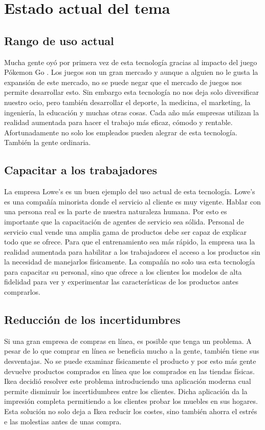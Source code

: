 \documentclass[a4paper,11pt]{scrartcl}
\begin{document}
\section{Estado actual del tema}
\subsection{Rango de uso actual}
Mucha gente oyó por primera vez de esta tecnología gracias al impacto del juego Pókemon Go \cite{pokemongo}. Los juegos son un gran mercado y aunque a alguien no le gusta la expansión de este mercado, no se puede negar que el mercado de juegos nos permite desarrollar esto. Sin embargo esta tecnología no nos deja solo diversificar nuestro ocio, pero también desarrollar el deporte, la medicina, el marketing, la ingeniería, la educación y muchas otras cosas. Cada año más empresas utilizan la realidad aumentada para hacer el trabajo más eficaz, cómodo y rentable. Afortunadamente no solo los empleados pueden alegrar de esta tecnología. También la gente ordinaria.

\subsection{Capacitar a los trabajadores}
La empresa Lowe's es un buen ejemplo del uso actual de esta tecnología. Lowe's es una compañía minorista donde el servicio al cliente es muy vigente. Hablar con una persona real es la parte de nuestra naturaleza humana. Por esto es importante que la capacitación de agentes de servicio sea sólida. Personal de servicio cual vende una amplia gama de productos debe ser capaz de explicar todo que se ofrece. Para que el entrenamiento sea más rápido, la empresa usa la realidad aumentada\cite{lowe} para habilitar a los trabajadores el acceso a los productos sin la necesidad de manejarlos físicamente. La compañía no solo usa esta tecnología para capacitar su personal, sino que ofrece a los clientes los modelos de alta fidelidad para ver y experimentar las características de los productos antes comprarlos.

\subsection{Reducción de los incertidumbres}
Si  una gran empresa de compras en línea, es posible que tenga un problema. A pesar de lo que comprar en línea se beneficia mucho a la gente, también tiene sus desventajas. No se puede examinar físicamente el producto y por esto más gente devuelve productos comprados en línea que los comprados en las tiendas físicas\cite{seo}. Ikea decidió resolver este problema introduciendo una aplicación moderna\cite{ikea} cual permite disminuir los incertidumbres entre los clientes. Dicha aplicación da la impresión completa permitiendo a los clientes probar los muebles en sus hogares. Esta solución no solo deja a Ikea reducir los costes, sino también ahorra el estrés e las molestias antes de unas compra.
\end{document}
